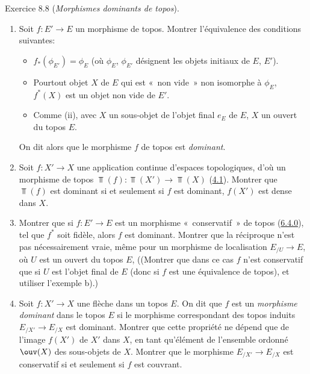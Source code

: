 \documentclass[10pt]{../fichiers-configuration-latex/smfart}
\begin{document}
\begin{enonce*}[remark]{Exercice 8.8}
(\emph{Morphismes dominants de topos}).
\begin{enumerate}
\renewcommand{\theenumi}{\alph{enumi}}
\renewcommand{\labelenumi}{\theenumi)}
\item Soit $f:E'\rightarrow E$ un morphisme de topos. Montrer
l'équivalence des conditions suivantes:

\begin{itemize}
\item[(i)] $f_{\ast}(\phi_{E'})=\phi_E$ (où $\phi_E$, $\phi_{E'}$
désignent les objets initiaux de $E$, $E'$).

\item[(ii)] Pour\pageoriginale tout objet $X$ de $E$ qui est « non
vide »  \ie non isomorphe à $\phi_E$, $f^{\ast}(X)$ est un objet
non vide de $E'$.

\item[$\rm(ii')$] Comme (ii), avec $X$ un sous-objet de l'objet final
$e_E$ de $E$, \ie $X$ un ouvert du topos $E$.
\end{itemize}

On dit alors que le morphisme $f$ de topos est \emph{dominant}.

\item Soit $f:X'\rightarrow X$ une application continue d'espaces
topologiques, d'où un morphisme de topos
$\Top(f):\Top(X')\rightarrow \Top(X)$ (\hyperref[IV.subsec4.1]{4.1}). Montrer
que $\Top(f)$ est dominant si et seulement si $f$ est dominant, \ie
$f(X')$ est dense dans $X$.

\item Montrer que si $f:E'\rightarrow E$ est un morphisme « conservatif »  de topos (\hyperref[IV.subsubsec6.4.0]{6.4.0}), \ie tel que
$f^{\ast}$ soit fidèle, alors $f$ est dominant. Montrer que la
réciproque n'est pas nécessairement vraie, même pour un
morphisme de
localisation $E_{/U}\rightarrow E$, où $U$ est un ouvert du topos
$E$, ((Montrer que dans ce cas $f$ n'est conservatif que si $U$ est
l'objet final de $E$ (donc si $f$ est une équivalence de topos), et
utiliser l'exemple b).)

\item Soit $f:X'\rightarrow X$ une flèche dans un topos $E$. On dit
que $f$ est un \emph{morphisme dominant} dans le topos $E$ si le
morphisme correspondant des topos induits $E_{/X'}\rightarrow
E_{/X}$  est dominant. Montrer que cette
propriété ne
dépend que de l'image $f(X')$ de $X'$ dans $X$, en tant qu'élément
de l'ensemble ordonné $\ouv(X)$ des sous-objets de $X$. Montrer que
le morphisme $E_{/X'}\rightarrow E_{/X}$ est conservatif si et
seulement si $f$ est couvrant.
\end{enumerate}
\end{enonce*}
\end{document}
